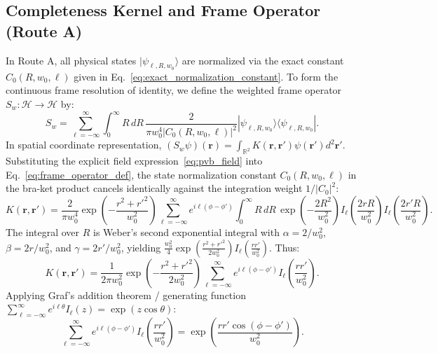 \documentclass{optica-article}
\begin{document}
\subsection{Completeness Kernel and Frame Operator (Route A)}

In Route A, all physical states $|\psi_{\ell, R, w_0}\rangle$ are normalized via the exact constant $C_0(R, w_0, \ell)$ given in Eq.~\eqref{eq:exact_normalization_constant}. To form the continuous frame resolution of identity, we define the weighted frame operator $S_w: \mathcal{H} \to \mathcal{H}$ by:
\begin{equation}
S_w = \sum_{\ell=-\infty}^\infty \int_0^\infty R \, dR \, \frac{2}{\pi w_0^4 |C_0(R, w_0, \ell)|^2} |\psi_{\ell, R, w_0}\rangle \langle \psi_{\ell, R, w_0}|.
\label{eq:frame_operator_def}
\end{equation}
In spatial coordinate representation, $(S_w \psi)(\mathbf{r}) = \int_{\mathbb{R}^2} K(\mathbf{r}, \mathbf{r}') \psi(\mathbf{r}') d^2\mathbf{r}'$. Substituting the explicit field expression~\eqref{eq:pvb_field} into Eq.~\eqref{eq:frame_operator_def}, the state normalization constant $C_0(R, w_0, \ell)$ in the bra-ket product cancels identically against the integration weight $1/|C_0|^2$:
\begin{equation}
K(\mathbf{r}, \mathbf{r}') = \frac{2}{\pi w_0^4} \exp\left( - \frac{r^2 + r'^2}{w_0^2} \right) \sum_{\ell=-\infty}^\infty e^{i \ell(\phi - \phi')} \int_0^\infty R \, dR \, \exp\left( - \frac{2 R^2}{w_0^2} \right) I_\ell\left( \frac{2 r R}{w_0^2} \right) I_\ell\left( \frac{2 r' R}{w_0^2} \right).
\label{eq:kernel_integral_setup}
\end{equation}
The integral over $R$ is Weber's second exponential integral with $\alpha = 2/w_0^2$, $\beta = 2r/w_0^2$, and $\gamma = 2r'/w_0^2$, yielding $\frac{w_0^2}{4} \exp(\frac{r^2 + r'^2}{2w_0^2}) I_\ell(\frac{r r'}{w_0^2})$. Thus:
\begin{equation}
K(\mathbf{r}, \mathbf{r}') = \frac{1}{2\pi w_0^2} \exp\left( - \frac{r^2 + r'^2}{2 w_0^2} \right) \sum_{\ell=-\infty}^\infty e^{i \ell(\phi - \phi')} I_\ell\left( \frac{r r'}{w_0^2} \right).
\label{eq:kernel_after_weber}
\end{equation}
Applying Graf's addition theorem / generating function $\sum_{\ell=-\infty}^\infty e^{i \ell \theta} I_\ell(z) = \exp(z \cos \theta)$:
\begin{equation}
\sum_{\ell=-\infty}^\infty e^{i \ell(\phi - \phi')} I_\ell\left( \frac{r r'}{w_0^2} \right) = \exp\left( \frac{r r' \cos(\phi - \phi')}{w_0^2} \right).
\label{eq:graf_application}
\end{equation}
\end{document}
